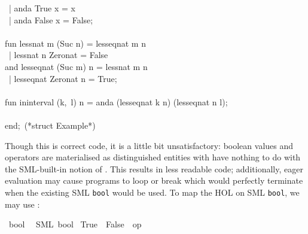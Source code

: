 \begin{isabellebody}
\begin{isamarkuptext}
\hspace*{0pt} ~| anda True x = x\\
\hspace*{0pt} ~| anda False x = False;\\
\hspace*{0pt}\\
\hspace*{0pt}fun less{}nat m (Suc n) = less{}eq{}nat m n\\
\hspace*{0pt} ~| less{}nat n Zero{}nat = False\\
\hspace*{0pt}and less{}eq{}nat (Suc m) n = less{}nat m n\\
\hspace*{0pt} ~| less{}eq{}nat Zero{}nat n = True;\\
\hspace*{0pt}\\
\hspace*{0pt}fun in{}interval (k,~l) n = anda (less{}eq{}nat k n) (less{}eq{}nat n l);\\
\hspace*{0pt}\\
\hspace*{0pt}end;~(*struct Example*)%
\end{isamarkuptext}%
\isamarkuptrue%
%
\endisatagquote
{\isafoldquote}%
%
\isadelimquote
%
\endisadelimquote
%
\begin{isamarkuptext}%
\noindent Though this is correct code, it is a little bit unsatisfactory:
  boolean values and operators are materialised as distinguished
  entities with have nothing to do with the SML-built-in notion
  of .  This results in less readable code;
  additionally, eager evaluation may cause programs to
  loop or break which would perfectly terminate when
  the existing SML \verb|bool| would be used.  To map
  the HOL  on SML \verb|bool|, we may use
  :%
\end{isamarkuptext}%
\isamarkuptrue%
%
\isadelimquotett
%
\endisadelimquotett
%
\isatagquotett
{}\isamarkupfalse%
\ bool\isanewline
\ \ {\isacharparenleft}SML\ {\isachardoublequoteopen}bool{\isachardoublequoteclose}{\isacharparenright}\isanewline
{}\isamarkupfalse%
\ True\ \ False\ \ {\isachardoublequoteopen}op\ {\isasymand}{\isachardoublequoteclose}\isanewline

\end{isabellebody}
